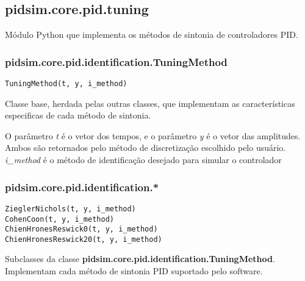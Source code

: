 \subsection{pidsim.core.pid.tuning}
    
    Módulo Python que implementa os métodos de sintonia de controladores
    \acs{PID}.
    
    \subsubsection{pidsim.core.pid.identification.TuningMethod}
        
        \begin{verbatim}
TuningMethod(t, y, i_method)\end{verbatim}
        
        Classe base, herdada pelas outras classes, que implementam as
        características especificas de cada método de sintonia.
        
        O parâmetro \textit{t} é o vetor dos tempos, e o parâmetro \textit{y} é o vetor das amplitudes.
        Ambos são retornados pelo método de discretização escolhido pelo
        usuário. \textit{i\_method} é o método de identificação desejado
        para simular o controlador
    
    \subsubsection{pidsim.core.pid.identification.*}
        
        \begin{verbatim}
ZieglerNichols(t, y, i_method)
CohenCoon(t, y, i_method)
ChienHronesReswick0(t, y, i_method)
ChienHronesReswick20(t, y, i_method)\end{verbatim}
        
        Subclasses da classe \textbf{pidsim.core.pid.identification.TuningMethod}.
        Implementam cada método de sintonia \acs{PID} suportado pelo software.
